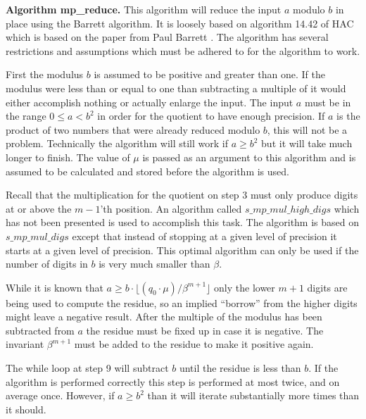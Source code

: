 \documentclass[b5paper]{book}
\begin{document}
\textbf{Algorithm mp\_reduce.}
This algorithm will reduce the input $a$ modulo $b$ in place using the Barrett algorithm.  It is loosely based on algorithm 14.42 of HAC
\cite[pp.  602]{HAC} which is based on the paper from Paul Barrett \cite{BARRETT}.  The algorithm has several restrictions and assumptions which must 
be adhered to for the algorithm to work.

First the modulus $b$ is assumed to be positive and greater than one.  If the modulus were less than or equal to one than subtracting
a multiple of it would either accomplish nothing or actually enlarge the input.  The input $a$ must be in the range $0 \le a < b^2$ in order
for the quotient to have enough precision.  If $a$ is the product of two numbers that were already reduced modulo $b$, this will not be a problem.
Technically the algorithm will still work if $a \ge b^2$ but it will take much longer to finish.  The value of $\mu$ is passed as an argument to this 
algorithm and is assumed to be calculated and stored before the algorithm is used.  

Recall that the multiplication for the quotient on step 3 must only produce digits at or above the $m-1$'th position.  An algorithm called 
$s\_mp\_mul\_high\_digs$ which has not been presented is used to accomplish this task.  The algorithm is based on $s\_mp\_mul\_digs$ except that
instead of stopping at a given level of precision it starts at a given level of precision.  This optimal algorithm can only be used if the number
of digits in $b$ is very much smaller than $\beta$.  

While it is known that 
$a \ge b \cdot \lfloor (q_0 \cdot \mu) / \beta^{m+1} \rfloor$ only the lower $m+1$ digits are being used to compute the residue, so an implied 
``borrow'' from the higher digits might leave a negative result.  After the multiple of the modulus has been subtracted from $a$ the residue must be 
fixed up in case it is negative.  The invariant $\beta^{m+1}$ must be added to the residue to make it positive again.  

The while loop at step 9 will subtract $b$ until the residue is less than $b$.  If the algorithm is performed correctly this step is 
performed at most twice, and on average once. However, if $a \ge b^2$ than it will iterate substantially more times than it should.
\end{document}
